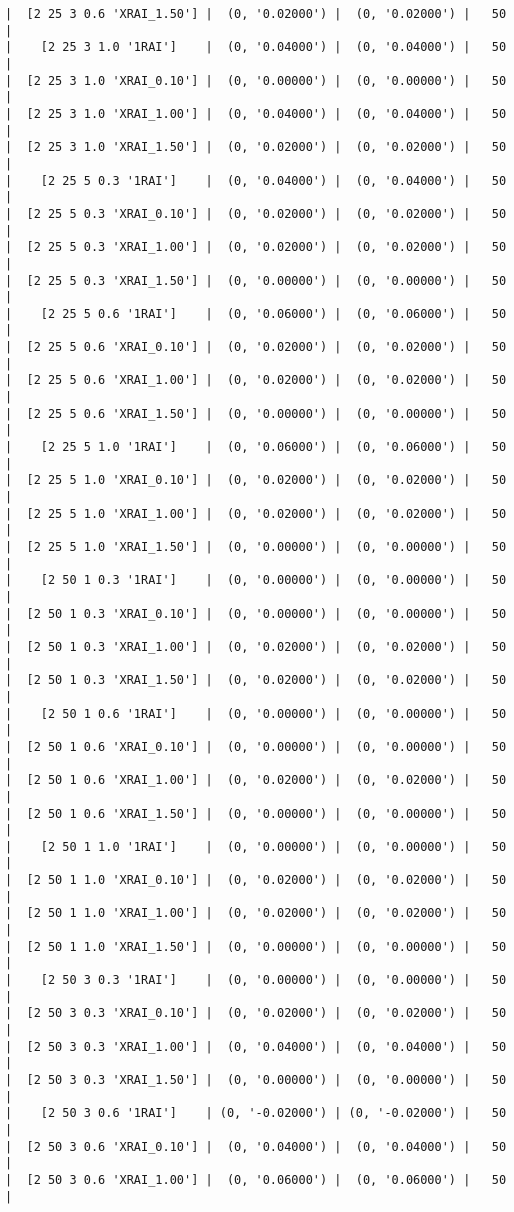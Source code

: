 \documentclass{article}
\begin{document}
\begin{verbatim}
|  [2 25 3 0.6 'XRAI_1.50'] |  (0, '0.02000') |  (0, '0.02000') |   50  |
|    [2 25 3 1.0 '1RAI']    |  (0, '0.04000') |  (0, '0.04000') |   50  |
|  [2 25 3 1.0 'XRAI_0.10'] |  (0, '0.00000') |  (0, '0.00000') |   50  |
|  [2 25 3 1.0 'XRAI_1.00'] |  (0, '0.04000') |  (0, '0.04000') |   50  |
|  [2 25 3 1.0 'XRAI_1.50'] |  (0, '0.02000') |  (0, '0.02000') |   50  |
|    [2 25 5 0.3 '1RAI']    |  (0, '0.04000') |  (0, '0.04000') |   50  |
|  [2 25 5 0.3 'XRAI_0.10'] |  (0, '0.02000') |  (0, '0.02000') |   50  |
|  [2 25 5 0.3 'XRAI_1.00'] |  (0, '0.02000') |  (0, '0.02000') |   50  |
|  [2 25 5 0.3 'XRAI_1.50'] |  (0, '0.00000') |  (0, '0.00000') |   50  |
|    [2 25 5 0.6 '1RAI']    |  (0, '0.06000') |  (0, '0.06000') |   50  |
|  [2 25 5 0.6 'XRAI_0.10'] |  (0, '0.02000') |  (0, '0.02000') |   50  |
|  [2 25 5 0.6 'XRAI_1.00'] |  (0, '0.02000') |  (0, '0.02000') |   50  |
|  [2 25 5 0.6 'XRAI_1.50'] |  (0, '0.00000') |  (0, '0.00000') |   50  |
|    [2 25 5 1.0 '1RAI']    |  (0, '0.06000') |  (0, '0.06000') |   50  |
|  [2 25 5 1.0 'XRAI_0.10'] |  (0, '0.02000') |  (0, '0.02000') |   50  |
|  [2 25 5 1.0 'XRAI_1.00'] |  (0, '0.02000') |  (0, '0.02000') |   50  |
|  [2 25 5 1.0 'XRAI_1.50'] |  (0, '0.00000') |  (0, '0.00000') |   50  |
|    [2 50 1 0.3 '1RAI']    |  (0, '0.00000') |  (0, '0.00000') |   50  |
|  [2 50 1 0.3 'XRAI_0.10'] |  (0, '0.00000') |  (0, '0.00000') |   50  |
|  [2 50 1 0.3 'XRAI_1.00'] |  (0, '0.02000') |  (0, '0.02000') |   50  |
|  [2 50 1 0.3 'XRAI_1.50'] |  (0, '0.02000') |  (0, '0.02000') |   50  |
|    [2 50 1 0.6 '1RAI']    |  (0, '0.00000') |  (0, '0.00000') |   50  |
|  [2 50 1 0.6 'XRAI_0.10'] |  (0, '0.00000') |  (0, '0.00000') |   50  |
|  [2 50 1 0.6 'XRAI_1.00'] |  (0, '0.02000') |  (0, '0.02000') |   50  |
|  [2 50 1 0.6 'XRAI_1.50'] |  (0, '0.00000') |  (0, '0.00000') |   50  |
|    [2 50 1 1.0 '1RAI']    |  (0, '0.00000') |  (0, '0.00000') |   50  |
|  [2 50 1 1.0 'XRAI_0.10'] |  (0, '0.02000') |  (0, '0.02000') |   50  |
|  [2 50 1 1.0 'XRAI_1.00'] |  (0, '0.02000') |  (0, '0.02000') |   50  |
|  [2 50 1 1.0 'XRAI_1.50'] |  (0, '0.00000') |  (0, '0.00000') |   50  |
|    [2 50 3 0.3 '1RAI']    |  (0, '0.00000') |  (0, '0.00000') |   50  |
|  [2 50 3 0.3 'XRAI_0.10'] |  (0, '0.02000') |  (0, '0.02000') |   50  |
|  [2 50 3 0.3 'XRAI_1.00'] |  (0, '0.04000') |  (0, '0.04000') |   50  |
|  [2 50 3 0.3 'XRAI_1.50'] |  (0, '0.00000') |  (0, '0.00000') |   50  |
|    [2 50 3 0.6 '1RAI']    | (0, '-0.02000') | (0, '-0.02000') |   50  |
|  [2 50 3 0.6 'XRAI_0.10'] |  (0, '0.04000') |  (0, '0.04000') |   50  |
|  [2 50 3 0.6 'XRAI_1.00'] |  (0, '0.06000') |  (0, '0.06000') |   50  |

\end{verbatim}
\end{document}

